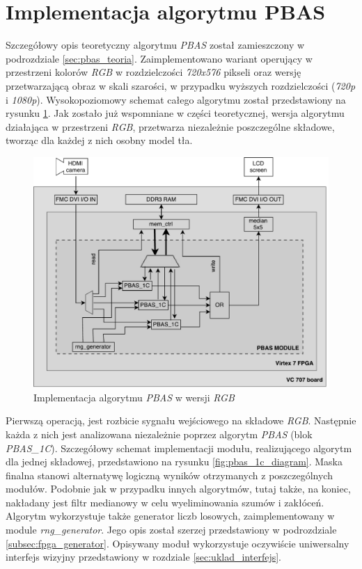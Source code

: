 \section{Implementacja algorytmu PBAS}
\label{sec:fpga_pbas}

Szczegółowy opis teoretyczny algorytmu \textit{PBAS} został zamieszczony w podrozdziale \ref{sec:pbas_teoria}. Zaimplementowano wariant operujący w przestrzeni kolorów \textit{RGB} w rozdzielczości \textit{720x576} pikseli oraz wersję przetwarzającą obraz w skali szarości, w przypadku wyższych rozdzielczości (\textit{720p} i \textit{1080p}). Wysokopoziomowy schemat całego algorytmu został przedstawiony na rysunku \ref{fig:pbas_diagram}. Jak zostało już wspomniane w części teoretycznej, wersja algorytmu działająca w przestrzeni \textit{RGB}, przetwarza niezależnie poszczególne składowe, tworząc dla każdej z nich osobny model tła. 
	
	\begin{figure}[h!]
		\centering
		\includegraphics[scale=0.6]{img/4/pbas.pdf}
		\caption{Implementacja algorytmu \textit{PBAS} w wersji \textit{RGB}}
		\label{fig:pbas_diagram}
	\end{figure}

Pierwszą operacją, jest rozbicie sygnału wejściowego na składowe \textit{RGB}. Następnie każda z nich jest analizowana niezależnie poprzez algorytm \textit{PBAS} (blok \textit{PBAS\_1C}). Szczegółowy schemat implementacji modułu, realizującego algorytm dla jednej składowej, przedstawiono na rysunku \ref{fig:pbas_1c_diagram}. Maska finalna stanowi alternatywę logiczną wyników otrzymanych z poszczególnych modułów. Podobnie jak w przypadku innych algorytmów, tutaj także, na koniec, nakładany jest filtr medianowy w celu wyeliminowania szumów i zakłóceń. Algorytm wykorzystuje także generator liczb losowych, zaimplementowany w module \textit{rng\_generator}. Jego opis został szerzej przedstawiony w podrozdziale \ref{subsec:fpga_generator}. Opisywany moduł wykorzystuje oczywiście uniwersalny interfejs wizyjny przedstawiony w rozdziale \ref{sec:uklad_interfejs}. 
	
